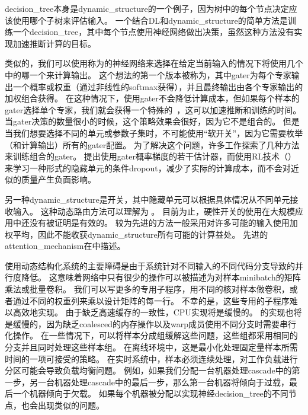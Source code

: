 \gls{decision_tree}本身是\gls{dynamic_structure}的一个例子，因为树中的每个节点决定应该使用哪个子树来评估输入。
一个结合\gls{DL}和\gls{dynamic_structure}的简单方法是训练一个\gls{decision_tree}，其中每个节点使用神经网络做出决策\citep{guo1992classification}，虽然这种方法没有实现加速推断计算的目标。



类似的，我们可以使用称为的神经网络来选择在给定当前输入的情况下将使用几个中的哪一个来计算输出。
这个想法的第一个版本被称为\citep{Nowlan90,Jacobs-nc91}，其中\gls{gater}为每个专家输出一个概率或权重（通过非线性的\gls{softmax}获得），并且最终输出由各个专家输出的加权组合获得。
在这种情况下，使用\gls{gater}不会降低计算成本，但如果每个样本的\gls{gater}选择单个专家，我们就会获得一个特殊的~\citep{collobert:2001:rr01-12,collobert:2002}，这可以加速推断和训练的时间。
当\gls{gater}决策的数量很小的时候，这个策略效果会很好，因为它不是组合的。
但是当我们想要选择不同的单元或参数子集时，不可能使用``软开关''，因为它需要枚举（和计算输出）所有的\gls{gater}配置。
为了解决这个问题，许多工作探索了几种方法来训练组合的\gls{gater}。
\citet{bengio-arxiv13-condcomp}提出使用\gls{gater}概率梯度的若干估计器，而\citet{Bacon-et-al-RLDM2015,BengioE-et-al-arXiv2015}使用\gls{RL}技术（）来学习一种形式的隐藏单元的条件\gls{dropout}，减少了实际的计算成本，而不会对近似的质量产生负面影响。


另一种\gls{dynamic_structure}是开关，其中隐藏单元可以根据具体情况从不同单元接收输入。
这种动态路由方法可以理解为 \citep{Olshausen1993}。
目前为止，硬性开关的使用在大规模应用中还没有被证明是有效的。
较为先进的方法一般采用对许多可能的输入使用加权平均，因此不能收获\gls{dynamic_structure}所有可能的计算益处。
先进的\gls{attention_mechanism}在中描述。



使用动态结构化系统的主要障碍是由于系统针对不同输入的不同代码分支导致的并行度降低。
这意味着网络中只有很少的操作可以被描述为对样本\gls{minibatch}的矩阵乘法或批量卷积。
我们可以写更多的专用子程序，用不同的核对样本做卷积，或者通过不同的权重列来乘以设计矩阵的每一行。
不幸的是，这些专用的子程序难以高效地实现。
由于缺乏高速缓存的一致性，CPU实现将是缓慢的。
的实现也将是缓慢的，因为缺乏\gls{coalesced}的内存操作以及\gls{warp}成员使用不同分支时需要串行化操作。
在一些情况下，可以将样本分成组缓解这些问题，这些组都采用相同的分支并且同时处理这些样本组。
在离线环境中，这是最小化处理固定量样本所需时间的一项可接受的策略。
在实时系统中，样本必须连续处理，对工作负载进行分区可能会导致负载均衡问题。
例如，如果我们分配一台机器处理\gls{cascade}中的第一步，另一台机器处理\gls{cascade}中的最后一步，那么第一台机器将倾向于过载，最后一个机器倾向于欠载。
如果每个机器被分配以实现神经\gls{decision_tree}的不同节点，也会出现类似的问题。


